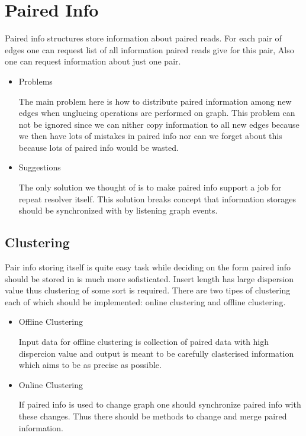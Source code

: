 \documentclass[14pt]{article}
\begin{document}
\section{Paired Info}

Paired info structures store information about paired reads. For each pair of edges one can request list of all information paired reads give for this pair, Also one can request information about just one pair.

\begin{itemize}
\item Problems

The main problem here is how to distribute paired information among new edges when unglueing operations are performed on graph. This problem can not be ignored since we can nither copy information to all new edges because we then have lots of mistakes in paired info nor can we forget about this because lots of paired info would be wasted.

\item Suggestions

The only solution we thought of is to make paired info support a job for repeat resolver itself. This solution breaks concept that information storages should be synchronized with by listening graph events.
\end{itemize}

\subsection{Clustering}
Pair info storing itself is quite easy task while deciding on the form paired info should be stored in is much more sofisticated. Insert length has large dispersion value thus clustering of some sort is required. There are two tipes of clustering each of which should be implemented: online clustering and offline clustering.

\begin{itemize}
\item Offline Clustering

Input data for offline clustering is collection of paired data with high dispercion value and output is meant to be carefully clasterised information which aims to be as precise as possible.

\item Online Clustering

If paired info is used to change graph one should synchronize paired info with these changes. Thus there should be methods to change and merge paired information.
\end{itemize}
\end{document}
